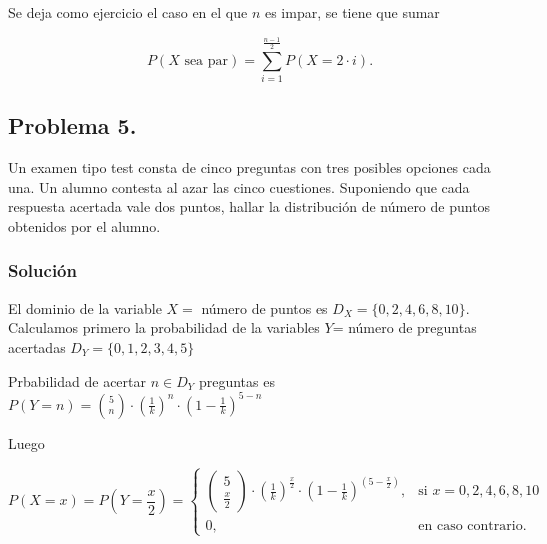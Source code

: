 \documentclass[
]{article}
\begin{document}
Se deja como ejercicio el caso en el que \(n\) es impar, se tiene que
sumar

\[
P(X\mbox{ sea par})=\sum_{i=1}^{\frac{n-1}{2}} P(X=2\cdot i).
\]

\hypertarget{problema-5.}{%
\subsection{Problema 5.}\label{problema-5.}}

Un examen tipo test consta de cinco preguntas con tres posibles opciones
cada una. Un alumno contesta al azar las cinco cuestiones. Suponiendo
que cada respuesta acertada vale dos puntos, hallar la distribución de
número de puntos obtenidos por el alumno.

\hypertarget{soluciuxf3n-4}{%
\subsubsection{Solución}\label{soluciuxf3n-4}}

El dominio de la variable \(X=\) número de puntos es
\(D_X=\{0,2,4,6,8,10\}\). Calculamos primero la probabilidad de la
variables \(Y\)= número de preguntas acertadas \(D_Y=\{0,1,2,3,4,5\}\)

Prbabilidad de acertar \(n\in D_Y\) preguntas es
\(P(Y=n)={5 \choose n}\cdot \left(\frac1k\right)^n\cdot \left(1-\frac1k\right)^{5-n}\)

Luego

\[
P(X=x)=P\left(Y=\frac{x}{2}\right)=\begin{cases}
\left(\begin{array}{c}5\\\frac{x}{2}\end{array}\right)\cdot \left(\frac1k\right)^\frac{x}{2}\cdot \left(1-\frac1k\right)^{\left(5-\frac{x}{2}\right)}, & \mbox{si }x=0,2,4,6,8,10 \\
0, & \mbox{en caso contrario.}
\end{cases}
\]
\end{document}
